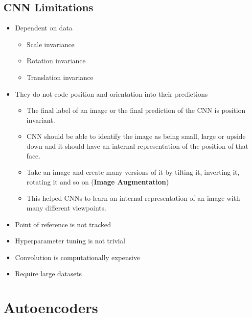 \documentclass[11pt]{article}
\begin{document}
\subsection{CNN Limitations}
\begin{itemize}
\item Dependent on data
\begin{itemize}
\item Scale invariance
\item Rotation invariance
\item Translation invariance
\end{itemize}
\item They do not code position and orientation into their predictions
\begin{itemize}
\item The final label of an image or the final prediction of the CNN is position invariant.
\item CNN should be able to identify the image as being small, large or upside down and it should have an internal representation of the position of that face.
\item Take an image and create many versions of it by tilting it, inverting it, rotating it and so on (\textbf{Image Augmentation})
\item This helped CNNs to learn an internal representation of an image with many different viewpoints.
\end{itemize}
\item Point of reference is not tracked
\item Hyperparameter tuning is not trivial
\item Convolution is computationally expensive
\item Require large datasets
\end{itemize}



\pagebreak



\section{Autoencoders}
\end{document}
